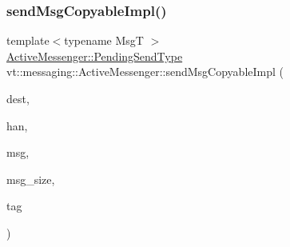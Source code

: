 \subsubsection{\texorpdfstring{send\+Msg\+Copyable\+Impl()}{sendMsgCopyableImpl()}}
{\footnotesize\ttfamily template$<$typename MsgT $>$ \\
\hyperlink{structvt_1_1messaging_1_1_active_messenger_a3626a6ca76d8ad4ec7c3b47a2c70d3a8}{Active\+Messenger\+::\+Pending\+Send\+Type} vt\+::messaging\+::\+Active\+Messenger\+::send\+Msg\+Copyable\+Impl (\begin{DoxyParamCaption}\item[{\hyperlink{namespacevt_a866da9d0efc19c0a1ce79e9e492f47e2}{Node\+Type}}]{dest,  }\item[{\hyperlink{namespacevt_af64846b57dfcaf104da3ef6967917573}{Handler\+Type}}]{han,  }\item[{\hyperlink{structvt_1_1messaging_1_1_msg_shared_ptr}{Msg\+Shared\+Ptr}$<$ MsgT $>$ \&}]{msg,  }\item[{\hyperlink{namespacevt_aab8d55968084610ce3b17057981e9300}{Byte\+Type}}]{msg\+\_\+size,  }\item[{\hyperlink{namespacevt_a84ab281dae04a52a4b243d6bf62d0e52}{Tag\+Type}}]{tag }\end{DoxyParamCaption})}

\mbox{\label{structvt_1_1messaging_1_1_active_messenger_ae4d52bd4014fe9cfee3a60bf477fe998}} 
